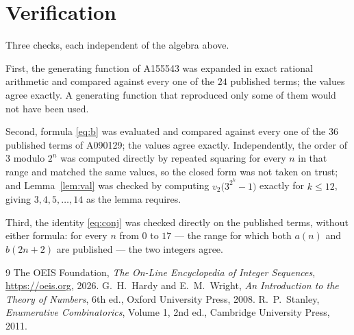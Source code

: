 \documentclass[11pt,a4paper]{article}
\theoremstyle{plain}
\theoremstyle{definition}
\begin{document}
\section{Verification}

Three checks, each independent of the algebra above.

First, the generating function of A155543 was expanded in exact rational arithmetic and
compared against every one of the $24$ published terms; the values agree exactly. A
generating function that reproduced only some of them would not have been used.

Second, formula \eqref{eq:b} was evaluated and compared against every one of the
$36$ published terms of A090129; the values agree exactly. Independently, the order
of $3$ modulo $2^{n}$ was computed directly by repeated squaring for every $n$ in that
range and matched the same values, so the closed form was not taken on trust; and
Lemma~\ref{lem:val} was checked by computing $v_2\bigl(3^{2^{k}}-1\bigr)$ exactly for
$k\le12$, giving $3,4,5,\dots,14$ as the lemma requires.

Third, the identity \eqref{eq:conj} was checked directly on the published terms, without
either formula: for every $n$ from $0$ to $17$ --- the range for which both $a(n)$ and
$b(2n+2)$ are published --- the two integers agree.

\begin{thebibliography}{9}
 The OEIS Foundation, \emph{The On-Line Encyclopedia of Integer Sequences},
\url{https://oeis.org}, 2026.
 G.~H.~Hardy and E.~M.~Wright, \emph{An Introduction to the Theory of
Numbers}, 6th ed., Oxford University Press, 2008.
 R.~P.~Stanley, \emph{Enumerative Combinatorics}, Volume 1, 2nd ed.,
Cambridge University Press, 2011.
\end{thebibliography}
\end{document}
